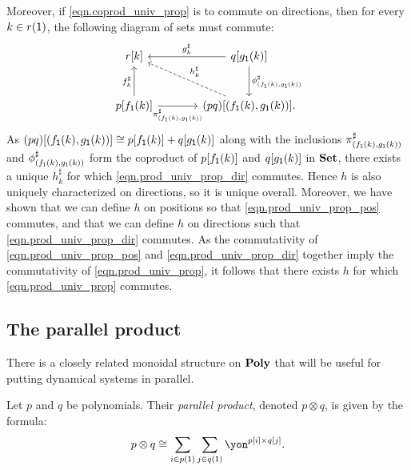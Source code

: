 \documentclass[Book-Poly]{subfiles}
\begin{document}
\begin{exercise}
\begin{solution}
Moreover, if \eqref{eqn.coprod_univ_prop} is to commute on directions, then for every $k \in r(\textsf{1})$, the following diagram of sets must commute:
\begin{equation} \label{eqn.prod_univ_prop_dir}
\begin{tikzcd}[sep=large]
	r[k] & q[g_\1(k)] \ar[l, "g^\sharp_k"'] \ar[d, "\phi^\sharp_{(f_\1(k), g_\1(k))}"] \\
	p[f_\1(k)] \ar[u, "f^\sharp_k"] \ar[r, "\pi^\sharp_{(f_\1(k), g_\1(k))}"'] & (pq)[(f_\1(k), g_\1(k))]. \ar[ul, "h^\sharp_k"', dashed] 
\end{tikzcd}
\end{equation}
As $(pq)[(f_{\textsf{1}}(k), g_{\textsf{1}}(k))] \cong p[f_{\textsf{1}}(k)] + q[g_{\textsf{1}}(k)]$ along with the inclusions $\pi^\sharp_{(f_{\textsf{1}}(k), g_{\textsf{1}}(k))}$ and $\phi^\sharp_{(f_{\textsf{1}}(k), g_{\textsf{1}}(k))}$ form the coproduct of $p[f_{\textsf{1}}(k)]$ and $q[g_{\textsf{1}}(k)]$ in $\mathbf{Set}$, there exists a unique $h^\sharp_k$ for which \eqref{eqn.prod_univ_prop_dir} commutes.
Hence $h$ is also uniquely characterized on directions, so it is unique overall.
Moreover, we have shown that we can define $h$ on positions so that \eqref{eqn.prod_univ_prop_pos} commutes, and that we can define $h$ on directions such that \eqref{eqn.prod_univ_prop_dir} commutes.
As the commutativity of \eqref{eqn.prod_univ_prop_pos} and \eqref{eqn.prod_univ_prop_dir} together imply the commutativity of \eqref{eqn.prod_univ_prop}, it follows that there exists $h$ for which \eqref{eqn.prod_univ_prop} commutes.
\end{solution}
\end{exercise}

\subsection{The parallel product} \label{subsec.poly.func_nat.monoidal.par}
There is a closely related monoidal structure on $\mathbf{Poly}$ that will be useful for putting dynamical systems in parallel.

\begin{definition} \label{def.dirichlet}
Let $p$ and $q$ be polynomials. Their \emph{parallel product}, denoted $p\otimes q$, is given by the formula:
\begin{equation}\label{eqn.parallel_def}
p\otimes q\iso\sum_{i\in p(\1)}\sum_{j\in q(\1)}\yon^{p[i]\times q[j]}.
\end{equation}
\end{definition}
\end{document}
